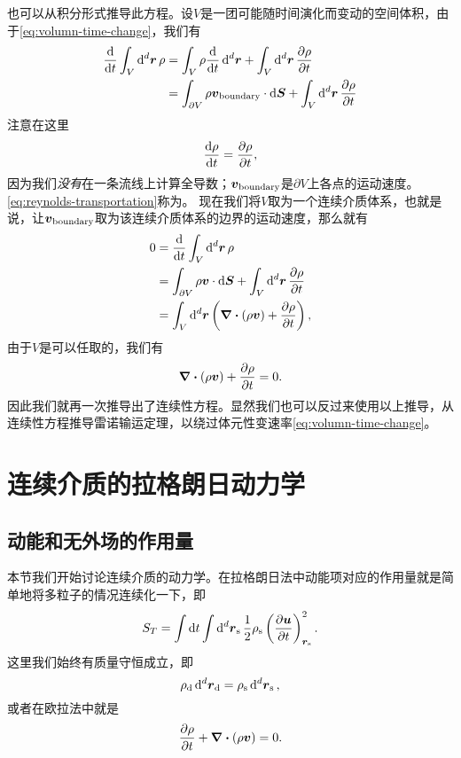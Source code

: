 也可以从积分形式推导此方程。设$V$是一团可能随时间演化而变动的空间体积，由于\eqref{eq:volumn-time-change}，我们有
\begin{equation}
    \begin{aligned}
        \dv{t} \int_V \dd[d]{\vb*{r}} \rho &= \int_V \rho \dv{t} \dd[d]{\vb*{r}} + \int_V \dd[d]{\vb*{r}} \pdv{\rho}{t} \\
        &= \int_{\partial V} \rho \vb*{v}_\text{boundary} \cdot \dd{\vb*{S}} + \int_V \dd[d]{\vb*{r}} \pdv{\rho}{t}
    \end{aligned}
    \label{eq:reynolds-transportation}
\end{equation}
注意在这里
\[
    \dv{\rho}{t} = \pdv{\rho}{t},
\]
因为我们\emph{没有}在一条流线上计算全导数；$\vb*{v}_\text{boundary}$是$\partial V$上各点的运动速度。
\eqref{eq:reynolds-transportation}称为。
现在我们将$V$取为一个连续介质体系，也就是说，让$\vb*{v}_\text{boundary}$取为该连续介质体系的边界的运动速度，那么就有
\[
    \begin{aligned}
        0 &= \dv{t} \int_V \dd[d]{\vb*{r}} \rho \\
        &= \int_{\partial V} \rho \vb*{v} \cdot \dd{\vb*{S}} + \int_V \dd[d]{\vb*{r}} \pdv{\rho}{t} \\
        &= \int_V \dd[d]{\vb*{r}} \left(\div{(\rho \vb*{v})} + \pdv{\rho}{t} \right),
    \end{aligned}
\]
由于$V$是可以任取的，我们有
\begin{equation}
    \div{(\rho \vb*{v})} + \pdv{\rho}{t} = 0.
\end{equation}
因此我们就再一次推导出了连续性方程。显然我们也可以反过来使用以上推导，从连续性方程推导雷诺输运定理，以绕过体元性变速率\eqref{eq:volumn-time-change}。

\section{连续介质的拉格朗日动力学}

\subsection{动能和无外场的作用量}

本节我们开始讨论连续介质的动力学。在拉格朗日法中动能项对应的作用量就是简单地将多粒子的情况连续化一下，即
\begin{equation}
    S_T = \int \dd{t} \int \dd[d]{\vb*{r}_\text{s}} \frac{1}{2} \rho_\text{s} \left( \pdv{\vb*{u}}{t} \right)_{\vb*{r}_\text{s}}^2.
    \label{eq:kinetic-action}
\end{equation}
这里我们始终有质量守恒成立，即
\begin{equation}
    \rho_\text{d} \dd[d]{\vb*{r}_\text{d}} = \rho_\text{s} \dd[d]{\vb*{r}_\text{s}},
    \label{eq:density-eq}
\end{equation}
或者在欧拉法中就是
\begin{equation}
    \pdv{\rho}{t} + \div{(\rho \vb*{v})} = 0.
    \label{eq:mass-conservation}
\end{equation}

